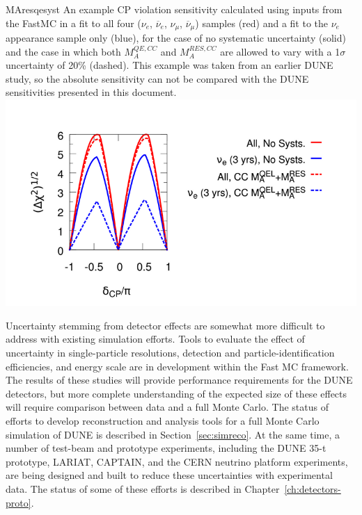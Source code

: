 \begin{cdrfigure}{MAresqesyst}{
An example CP violation sensitivity calculated using inputs from the 
  FastMC in a fit to all four ($\nu_e$, $\overline\nu_e$, $\nu_{\mu}$, 
  $\overline\nu_{\mu}$) samples (red) and a fit to the $\nu_e$ appearance sample 
  only (blue), for the case of no systematic uncertainty (solid) and the case in
  which both $M_A^{QE,CC}$ and $M_A^{RES,CC}$ are allowed to vary with a
  1$\sigma$ uncertainty of 20\% (dashed). This example was taken from an earlier
  DUNE study, so the absolute sensitivity can not be compared with the DUNE 
  sensitivities presented in this document.}
\includegraphics[width=0.8\linewidth]{volume-physics/figures/CPV_MARESQE.png}
\end{cdrfigure}

Uncertainty stemming from detector effects
are somewhat more difficult to address with existing
simulation efforts. Tools to evaluate the effect of uncertainty in single-particle resolutions,
detection and particle-identification efficiencies, and energy scale are in development within
the Fast MC framework. The results of these studies will provide performance requirements
for the DUNE detectors, but more complete understanding of the expected size of these effects
will require comparison between data and a full Monte Carlo.
The status of efforts to develop reconstruction and analysis tools for a full Monte Carlo simulation
of DUNE is described in Section~\ref{sec:simreco}. At the same time,
a number of test-beam and prototype experiments, including the DUNE 35-t prototype,
LARIAT, CAPTAIN, and the CERN neutrino platform experiments, are being designed and built to reduce these
uncertainties with experimental data. The status of some of these efforts is described in
Chapter~\ref{ch:detectors-proto}.











